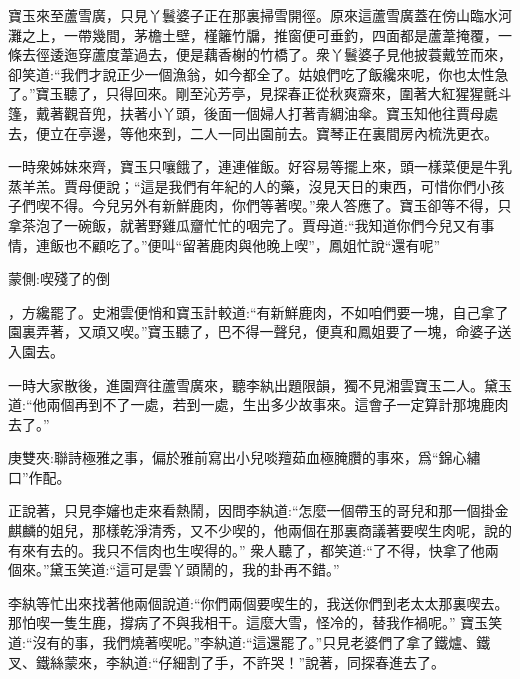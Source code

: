 \begin{parag}
    寶玉來至蘆雪廣，只見丫鬟婆子正在那裏掃雪開徑。原來這蘆雪廣蓋在傍山臨水河灘之上，一帶幾間，茅檐土壁，槿籬竹牖，推窗便可垂釣，四面都是蘆葦掩覆，一條去徑逶迤穿蘆度葦過去，便是藕香榭的竹橋了。衆丫鬟婆子見他披蓑戴笠而來，卻笑道:“我們才說正少一個漁翁，如今都全了。姑娘們吃了飯纔來呢，你也太性急了。”寶玉聽了，只得回來。剛至沁芳亭，見探春正從秋爽齋來，圍著大紅猩猩氈斗篷，戴著觀音兜，扶著小丫頭，後面一個婦人打著青綢油傘。寶玉知他往賈母處去，便立在亭邊，等他來到，二人一同出園前去。寶琴正在裏間房內梳洗更衣。
\end{parag}


\begin{parag}
    一時衆姊妹來齊，寶玉只嚷餓了，連連催飯。好容易等擺上來，頭一樣菜便是牛乳蒸羊羔。賈母便說；“這是我們有年紀的人的藥，沒見天日的東西，可惜你們小孩子們喫不得。今兒另外有新鮮鹿肉，你們等著喫。”衆人答應了。寶玉卻等不得，只拿茶泡了一碗飯，就著野雞瓜齏忙忙的咽完了。賈母道:“我知道你們今兒又有事情，連飯也不顧吃了。”便叫“留著鹿肉與他晚上喫”，鳳姐忙說“還有呢”\begin{note}蒙側:喫殘了的倒\end{note}，方纔罷了。史湘雲便悄和寶玉計較道:“有新鮮鹿肉，不如咱們要一塊，自己拿了園裏弄著，又頑又喫。”寶玉聽了，巴不得一聲兒，便真和鳳姐要了一塊，命婆子送入園去。
\end{parag}


\begin{parag}
    一時大家散後，進園齊往蘆雪廣來，聽李紈出題限韻，獨不見湘雲寶玉二人。黛玉道:“他兩個再到不了一處，若到一處，生出多少故事來。這會子一定算計那塊鹿肉去了。”\begin{note}庚雙夾:聯詩極雅之事，偏於雅前寫出小兒啖羶茹血極腌臢的事來，爲“錦心繡口”作配。\end{note}正說著，只見李嬸也走來看熱鬧，因問李紈道:“怎麼一個帶玉的哥兒和那一個掛金麒麟的姐兒，那樣乾淨清秀，又不少喫的，他兩個在那裏商議著要喫生肉呢，說的有來有去的。我只不信肉也生喫得的。” 衆人聽了，都笑道:“了不得，快拿了他兩個來。”黛玉笑道:“這可是雲丫頭鬧的，我的卦再不錯。”
\end{parag}


\begin{parag}
    李紈等忙出來找著他兩個說道:“你們兩個要喫生的，我送你們到老太太那裏喫去。那怕喫一隻生鹿，撐病了不與我相干。這麼大雪，怪冷的，替我作禍呢。” 寶玉笑道:“沒有的事，我們燒著喫呢。”李紈道:“這還罷了。”只見老婆們了拿了鐵爐、鐵叉、鐵絲蒙來，李紈道:“仔細割了手，不許哭！”說著，同探春進去了。
\end{parag}


